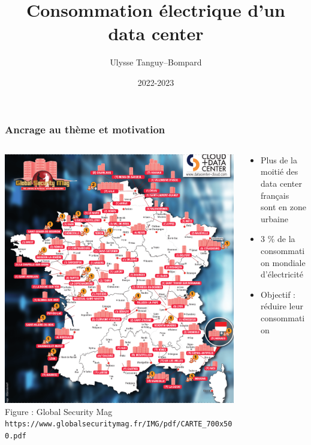\documentclass[a4paper,11pt]{beamer}
\title{Consommation électrique d'un data center}
\author{Ulysse Tanguy--Bompard}
\institute{Candidat n° 15937}
\date{2022-2023}
\newcommand{\p}{\texttt} %
\begin{document}

\maketitle %


\begin{frame}
    \frametitle{Ancrage au thème et motivation}

    \begin{columns}
        \begin{column}{0.5\textwidth}
            \includegraphics[width=\textwidth]{carte_data_center.png}
            \scriptsize{Figure : Global Security Mag \p{https://www.globalsecuritymag.fr/IMG/pdf/CARTE\_700x500.pdf}}
        \end{column}
        \begin{column}{0.5\textwidth}
            \begin{itemize}
                \item Plus de la moitié des data center français sont en zone urbaine
                \item 3 \% de la consommation mondiale d'électricité
                \item Objectif : réduire leur consommation
            \end{itemize}
        \end{column}
    \end{columns}
\end{frame}
\end{document}
